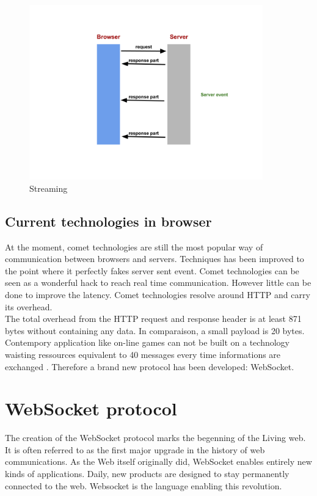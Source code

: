 \begin{figure}[H]
\centering
\includegraphics[width=0.9\textwidth]{./Figures/streaming.png}
\caption[streaming]{Streaming}
\label{fig:streaming}
\end{figure}

\subsection{Current technologies in browser}

At the moment, comet technologies are still the most popular way of
communication between browsers and servers. Techniques has been improved to
the point where it perfectly fakes server sent event. Comet technologies can be
seen as a wonderful hack to reach real time communication. However little can
be done to improve the latency. Comet technologies resolve around HTTP and
carry its overhead.\\

The total overhead from the HTTP request and response header is at least 871
bytes without containing any data. In comparaison, a small payload is 20 bytes.
Contempory application like on-line games can not be built on a technology
waisting ressources equivalent to 40 messages every time informations are
exchanged \citep{Reference2}. Therefore a brand new protocol has been
developed: WebSocket.\\

\section{WebSocket protocol}

The creation of the WebSocket protocol marks the begenning of the Living web.
It is often referred to as the first major upgrade in the history of web
communications. As the Web itself originally did, WebSocket enables entirely
new kinds of applications. Daily, new products are designed to stay permanently
connected to the web. Websocket is the language enabling this revolution.\\

